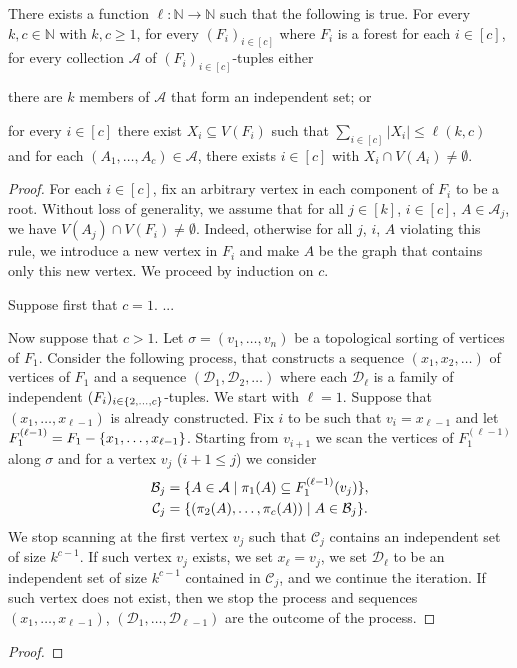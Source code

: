 \documentclass{patmorin}
\DeclarePairedDelimiter\set{\{}{\}}
\begin{document}
\begin{lem}
There exists a function $\ell:\mathbb{N}\to\mathbb{N}$ such that the following is true. 
For every $k,c\in\mathbb{N}$ with $k,c\geq1$, 
for every $(F_i)_{i\in[c]}$ where $F_i$ is a forest for each $i\in[c]$,
for every collection $\mathcal{A}$ of $(F_i)_{i\in[c]}$-tuples
either
   \begin{tightenum}%
     \item there are $k$ members of $\mathcal{A}$ that form an independent set; or
     \item for every $i\in[c]$ there exist $X_i \subseteq V(F_i)$ such that
     $\sum_{i\in[c]}|X_i|\leq \ell(k,c)$ and for each $(A_1,\ldots,A_c)\in\mathcal{A}$, 
     there exists $i\in[c]$ with
     $X_i\cap V(A_i)\neq\emptyset$.  
   \end{tightenum}
\end{lem}
\begin{proof}
For each $i\in[c]$, fix an arbitrary vertex in each component of $F_i$ to be a root. 
Without loss of generality, 
we assume that for all $j\in[k]$, $i\in[c]$, $A\in\mathcal{A}_j$, 
we have $V(A_j)\cap V(F_i)\neq\emptyset$. 
Indeed, otherwise for all $j$, $i$, $A$ violating this rule, we introduce a new vertex in $F_i$ and make $A$ be the graph that contains only this new vertex.
We proceed by induction on $c$.

Suppose first that $c=1$. ...

Now suppose that $c>1$. 
Let $\sigma=(v_1,\ldots,v_n)$ be a topological sorting of vertices of $F_1$. 
Consider the following process, that constructs a sequence $(x_1,x_2,\ldots)$ of vertices of $F_1$ and a sequence $(\mathcal{D}_1,\mathcal{D}_2,\ldots)$ where each $\mathcal{D_\ell}$ is a family of independent $(F_i)_{i\in\set{2,\ldots,c}}$-tuples. 
We start with $\ell=1$. Suppose that $(x_1,\ldots,x_{\ell-1})$ is already constructed. 
Fix $i$ to be such that $v_i=x_{\ell-1}$ and let $F^{(\ell-1)}_1=F_1-\set{x_1,\ldots,x_{\ell-1}}$. 
Starting from $v_{i+1}$ we scan the vertices of $F_1^{(\ell-1)}$ along $\sigma$ and for a vertex $v_j$ ($i+1\leq j$) we consider
\begin{align*}
\mathcal{B}_j&=\set{A\in \mathcal{A}\mid \pi_1(A)\subseteq F^{(\ell-1)}_1(v_j)},\\
\mathcal{C}_j&=\set{(\pi_2(A),\ldots,\pi_c(A))\mid A\in\mathcal{B}_j}.
\end{align*}
We stop scanning at the first vertex $v_j$ such that $\mathcal{C}_j$ contains an independent set of size $k^{c-1}$. 
If such vertex $v_j$ exists, 
we set $x_{\ell}=v_j$, 
we set $\mathcal{D}_{\ell}$ to be an independent set of size $k^{c-1}$ contained in $\mathcal{C}_j$, and we continue the iteration. 
If such vertex does not exist, then we stop the process and sequences $(x_1,\ldots,x_{\ell-1})$, $(\mathcal{D}_1,\ldots,\mathcal{D}_{\ell-1})$ are the outcome of the process.



\end{proof}

\hungarians*
\begin{proof}
\end{proof}
\end{document}
